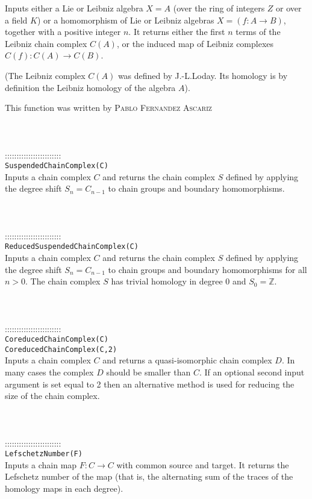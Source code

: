 \documentclass[a4paper,11pt]{report}
\begin{document}
{ Inputs either a Lie or Leibniz algebra $X=A$ (over the ring of integers $Z$ or over a field $K$) or a homomorphism of Lie or Leibniz algebras $X=(f:A \longrightarrow B)$, together with a positive integer $n$. It returns either the first $n$ terms of the Leibniz chain complex $C(A)$, or the induced map of Leibniz complexes $C(f):C(A) \longrightarrow C(B)$. 

 (The Leibniz complex $C(A)$ was defined by J.-L.Loday. Its homology is by definition the Leibniz homology
of the algebra $A$). 

 This function was written by \textsc{Pablo Fernandez Ascariz} \\
 \\
 \\
 \\
 ::::::::::::::::::::::::\\
 \texttt{SuspendedChainComplex(C)}\\
 

 Inputs a chain complex $C$ and returns the chain complex $S$ defined by applying the degree shift $S_n = C_{n-1}$ to chain groups and boundary homomorphisms. \\
 \\
 \\
 \\
 ::::::::::::::::::::::::\\
 \texttt{ReducedSuspendedChainComplex(C)}\\
 

 Inputs a chain complex $C$ and returns the chain complex $S$ defined by applying the degree shift $S_n = C_{n-1}$ to chain groups and boundary homomorphisms for all $n > 0$. The chain complex $S$ has trivial homology in degree $0$ and $S_0=\mathbb Z$. \\
 \\
 \\
 \\
 ::::::::::::::::::::::::\\
 \texttt{CoreducedChainComplex(C)}\\
 \texttt{CoreducedChainComplex(C,2)}\\
 

 Inputs a chain complex $C$ and returns a quasi-isomorphic chain complex $D$. In many cases the complex $D$ should be smaller than $C$. If an optional second input argument is set equal to 2 then an alternative
method is used for reducing the size of the chain complex. \\
 \\
 \\
 \\
 ::::::::::::::::::::::::\\
 \texttt{LefschetzNumber(F)}\\
 

 Inputs a chain map $F\colon C\rightarrow C$ with common source and target. It returns the Lefschetz number of the map
(that is, the alternating sum of the traces of the homology maps in each
degree). \\
 \\
 \\
 }
\end{document}
